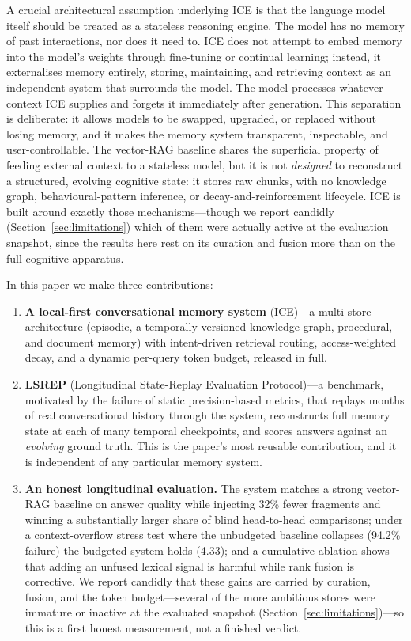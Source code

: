 \documentclass[10pt]{article}
\begin{document}
A crucial architectural assumption underlying ICE is that the language model itself should be treated as a stateless reasoning engine. The model has no memory of past interactions, nor does it need to. ICE does not attempt to embed memory into the model's weights through fine-tuning or continual learning; instead, it externalises memory entirely, storing, maintaining, and retrieving context as an independent system that surrounds the model. The model processes whatever context ICE supplies and forgets it immediately after generation. This separation is deliberate: it allows models to be swapped, upgraded, or replaced without losing memory, and it makes the memory system transparent, inspectable, and user-controllable. The vector-RAG baseline shares the superficial property of feeding external context to a stateless model, but it is not \emph{designed} to reconstruct a structured, evolving cognitive state: it stores raw chunks, with no knowledge graph, behavioural-pattern inference, or decay-and-reinforcement lifecycle. ICE is built around exactly those mechanisms---though we report candidly (Section~\ref{sec:limitations}) which of them were actually active at the evaluation snapshot, since the results here rest on its curation and fusion more than on the full cognitive apparatus.

In this paper we make three contributions:

\begin{enumerate}[leftmargin=*]
  \item \textbf{A local-first conversational memory system} (ICE)---a multi-store architecture (episodic, a temporally-versioned knowledge graph, procedural, and document memory) with intent-driven retrieval routing, access-weighted decay, and a dynamic per-query token budget, released in full.
  \item \textbf{LSREP} (Longitudinal State-Replay Evaluation Protocol)---a benchmark, motivated by the failure of static precision-based metrics, that replays months of real conversational history through the system, reconstructs full memory state at each of many temporal checkpoints, and scores answers against an \emph{evolving} ground truth. This is the paper's most reusable contribution, and it is independent of any particular memory system.
  \item \textbf{An honest longitudinal evaluation.} The system matches a strong vector-RAG baseline on answer quality while injecting 32\% fewer fragments and winning a substantially larger share of blind head-to-head comparisons; under a context-overflow stress test where the unbudgeted baseline collapses (94.2\% failure) the budgeted system holds (4.33); and a cumulative ablation shows that adding an unfused lexical signal is harmful while rank fusion is corrective. We report candidly that these gains are carried by curation, fusion, and the token budget---several of the more ambitious stores were immature or inactive at the evaluated snapshot (Section~\ref{sec:limitations})---so this is a first honest measurement, not a finished verdict.
\end{enumerate}
\end{document}
